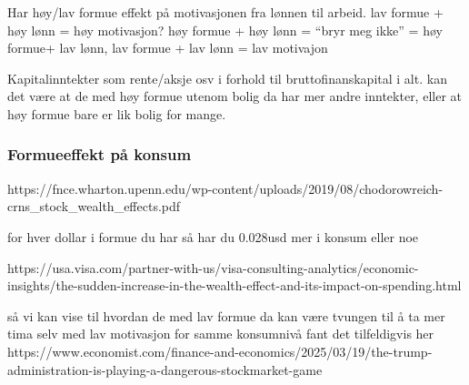 \documentclass[
  12pt,
  a4paper,
  DIV=11,
  numbers=noendperiod]{scrartcl}
\begin{document}
Har høy/lav formue effekt på motivasjonen fra lønnen til arbeid. lav
formue + høy lønn = høy motivasjon? høy formue + høy lønn = ``bryr meg
ikke'' = høy formue+ lav lønn, lav formue + lav lønn = lav motivajon

Kapitalinntekter som rente/aksje osv i forhold til bruttofinanskapital i
alt. kan det være at de med høy formue utenom bolig da har mer andre
inntekter, eller at høy formue bare er lik bolig for mange.

\subsubsection{Formueeffekt på konsum}\label{formueeffekt-puxe5-konsum}

https://fnce.wharton.upenn.edu/wp-content/uploads/2019/08/chodorowreich-crns\_stock\_wealth\_effects.pdf

for hver dollar i formue du har så har du 0.028usd mer i konsum eller
noe

https://usa.visa.com/partner-with-us/visa-consulting-analytics/economic-insights/the-sudden-increase-in-the-wealth-effect-and-its-impact-on-spending.html

så vi kan vise til hvordan de med lav formue da kan være tvungen til å
ta mer tima selv med lav motivasjon for samme konsumnivå fant det
tilfeldigvis her
https://www.economist.com/finance-and-economics/2025/03/19/the-trump-administration-is-playing-a-dangerous-stockmarket-game
\end{document}
